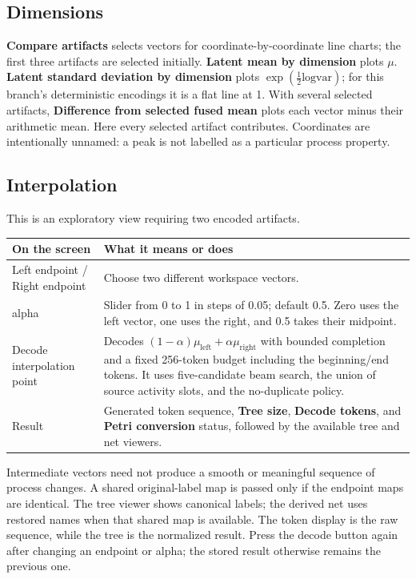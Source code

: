 \documentclass[11pt,a4paper]{article}
\makeatletter
\newcommand{\ui}[1]{\textbf{#1}}
\newenvironment{controls}{%
  \small\begin{longtable}{@{}>{\raggedright\arraybackslash}p{.34\linewidth}
    >{\raggedright\arraybackslash}p{.62\linewidth}@{}}
  \toprule\textbf{On the screen} & \textbf{What it means or does}\\\midrule\endhead
  \bottomrule\endfoot
}{\end{longtable}\normalsize}
\makeatother
\begin{document}
\subsection{Dimensions}
\ui{Compare artifacts} selects vectors for coordinate-by-coordinate line
charts; the first three artifacts are selected initially. \ui{Latent mean by
dimension} plots $\mu$. \ui{Latent standard deviation by dimension} plots
$\exp(\tfrac12\text{logvar})$; for this branch's deterministic encodings it
is a flat line at 1. With several selected artifacts,
\ui{Difference from selected fused mean} plots each vector minus their
arithmetic mean. Here every selected artifact contributes. Coordinates are
intentionally unnamed: a peak is not labelled as a particular process property.

\subsection{Interpolation}
This is an exploratory view requiring two encoded artifacts.
\begin{controls}
Left endpoint / Right endpoint & Choose two different workspace vectors.\\
alpha & Slider from 0 to 1 in steps of 0.05; default 0.5. Zero uses the left
vector, one uses the right, and 0.5 takes their midpoint.\\
Decode interpolation point & Decodes $(1-\alpha)\mu_{\mathrm{left}}+
\alpha\mu_{\mathrm{right}}$ with bounded completion and a fixed 256-token
budget including the beginning/end tokens. It uses five-candidate beam search,
the union of source activity slots, and the no-duplicate policy.\\
Result & Generated token sequence, \ui{Tree size}, \ui{Decode tokens}, and
\ui{Petri conversion} status, followed by the available tree and net viewers.\\
\end{controls}

Intermediate vectors need not produce a smooth or meaningful sequence of
process changes. A shared original-label map is passed only if the endpoint
maps are identical. The tree viewer shows canonical labels; the derived net
uses restored names when that shared map is available. The token display is
the raw sequence, while the tree is the normalized result. Press the decode
button again after changing an endpoint or alpha; the stored result otherwise
remains the previous one.
\end{document}
